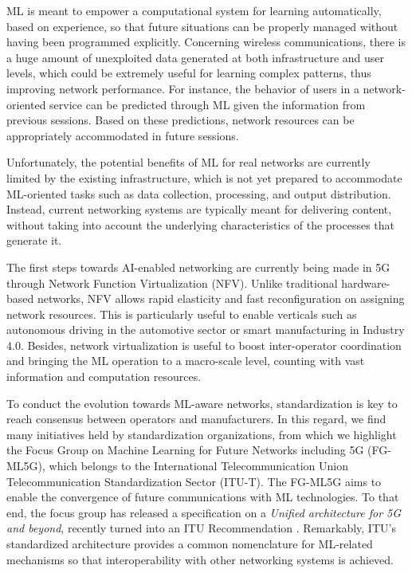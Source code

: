 \documentclass[journal]{IEEEtran}
\begin{document}
ML is meant to empower a computational system for learning automatically, based on experience, so that future situations can be properly managed without having been programmed explicitly. Concerning wireless communications, there is a huge amount of unexploited data generated at both infrastructure and user levels, which could be extremely useful for learning complex patterns, thus improving network performance. For instance, the behavior of users in a network-oriented service can be predicted through ML given the information from previous sessions. Based on these predictions, network resources can be appropriately accommodated in future sessions.

Unfortunately, the potential benefits of ML for real networks are currently limited by the existing infrastructure, which is not yet prepared to accommodate ML-oriented tasks such as data collection, processing, and output distribution. Instead, current networking systems are typically meant for delivering content, without taking into account the underlying characteristics of the processes that generate it.

The first steps towards AI-enabled networking are currently being made in 5G through Network Function Virtualization (NFV). Unlike traditional hardware-based networks, NFV allows rapid elasticity and fast reconfiguration on assigning network resources. This is particularly useful to enable verticals such as autonomous driving in the automotive sector or smart manufacturing in Industry 4.0. Besides, network virtualization is useful to boost inter-operator coordination and bringing the ML operation to a macro-scale level, counting with vast information and computation resources. 

To conduct the evolution towards ML-aware networks, standardization is key to reach consensus between operators and manufacturers. In this regard, we find many initiatives held by standardization organizations, from which we highlight the Focus Group on Machine Learning for Future Networks including 5G (FG-ML5G), which belongs to the International Telecommunication Union Telecommunication Standardization Sector (ITU-T). The FG-ML5G aims to enable the convergence of future communications with ML technologies. To that end, the focus group has released a specification on a \emph{Unified architecture for 5G and beyond}, recently turned into an ITU Recommendation \cite{itu2019architecture}. Remarkably, ITU's standardized architecture provides a common nomenclature for ML-related mechanisms so that interoperability with other networking systems is achieved. 
\end{document}
